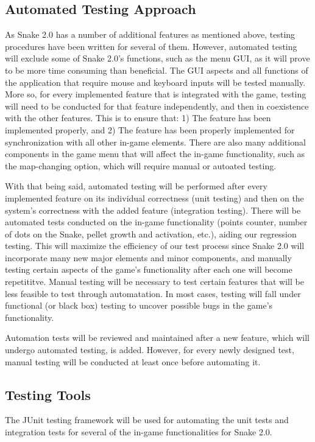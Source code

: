 \documentclass[12pt, titlepage]{article}
\begin{document}
\subsection{Automated Testing Approach}
As Snake 2.0 has a number of additional features as mentioned above, testing procedures have been written for several of them. However, automated testing will exclude some of Snake 2.0's functions, such as the menu GUI, as it will prove to be more time consuming than beneficial. The GUI aspects and all functions of the application that require mouse and keyboard inputs will be tested manually. More so, for every implemented feature that is integrated with the game, testing will need to be conducted for that feature independently, and then in coexistence with the other features. This is to ensure that: 1) The feature has been implemented properly, and 2) The feature has been properly implemented for synchronization with all other in-game elements. There are also many additional components in the game menu that will affect the in-game functionality, such as the map-changing option, which will require manual or autoated testing.

With that being said, automated testing will be performed after every implemented feature on its individual correctness (unit testing) and then on the system's correctness with the added feature (integration testing). There will be automated tests conducted on the in-game functionality (points counter, number of dots on the Snake, pellet growth and activation, etc.), aiding our regression testing. This will maximize the efficiency of our test process since Snake 2.0 will incorporate many new major elements and minor components, and manually testing certain aspects of the game's functionality after each one will become repetititve. Manual testing will be necessary to test certain features that will be less feasible to test through automatation. In most cases, testing will fall under functional (or black box) testing to uncover possible bugs in the game's functionality.

Automation tests will be reviewed and maintained after a new feature, which will undergo automated testing, is added. However, for every newly designed test, manual testing will be conducted at least once before automating it.

\subsection{Testing Tools}
The JUnit testing framework will be used for automating the unit tests and integration tests for several of the in-game functionalities for Snake 2.0.
\end{document}
